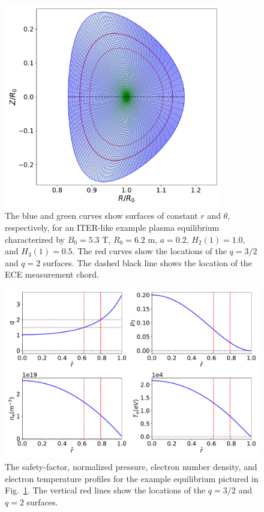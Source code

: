 \documentclass{iopjournal}
\begin{document}
{\begin{figure}
\centerline{\includegraphics[width=0.85\textwidth]{Fig1.pdf}}
\caption{The blue and green curves show surfaces of constant $r$ and $\theta$, respectively, for an ITER-like example
plasma equilibrium characterized by $B_0=5.3$ T, $R_0=6.2$ m, $a=0.2$, $H_2(1)=1.0$, and $H_3(1)= 0.5$. The red curves show
the locations of the $q=3/2$ and $q=2$ surfaces.  The dashed black line shows the location of the ECE measurement chord. \label{figa}}
\end{figure}

\begin{figure}
\centerline{\includegraphics[width=1.0\textwidth]{Fig2.pdf}}
\caption{The safety-factor, normalized pressure, electron number density, and electron temperature profiles for the
example equilibrium pictured in Fig.~\ref{figa}. The vertical red lines show the locations of the $q=3/2$ and $q=2$
surfaces.   \label{figb}}
\end{figure}

}
\end{document}
